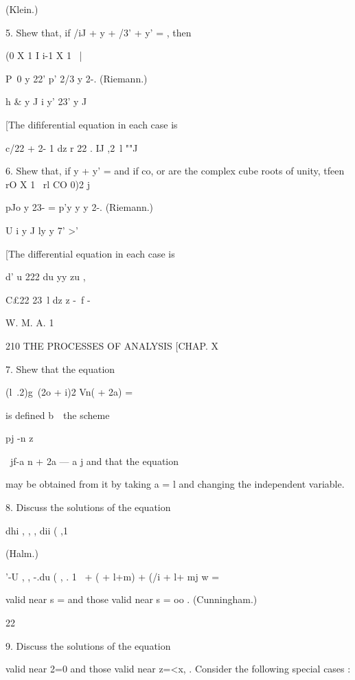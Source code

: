 (Klein.) 

5. Shew that, if /iJ + y + /3' + y' =  , then 

(0 X 1 I i-1 X 1 ~| 



P\ 0   y 22' p' 2/3 y 2-. (Riemann.) 

h \& y J i y' 23' y J 

[The dififerential equation in each case is 

c/22 +  2- 1 dz   r 22 . IJ ,2\ l ""J 

6. Shew that, if y + y' =   and if co, or are the complex cube roots of unity, tfeen 
rO X 1 \ rl CO 0)2  j 

pJo y 23- = p'y y y 2-. (Riemann.) 

U i y J ly y 7' >' 

[The differential equation in each case is 

d' u 222 du  yy zu   , 

C£22 23\ l dz   z -\ f  -  

W. M. A. 1  



210 THE PROCESSES OF ANALYSIS [CHAP. X 

7. Shew that the equation 



(l\ .2)g\ (2o + i)2 Vn(  + 2a)  = 



is defined b\ \   the scheme 

pj -n z  

\ jf-a n + 2a   — a j 
and that the equation 

may be obtained from it by taking a = l and changing the independent variable. 

8. Discuss the solutions of the equation 

dhi , , , dii ( ,1 



(Halm.) 



'-U , , -.du ( , . 1 \   
  + (  + l+m)  + (/i + l+ mj w = 

valid near s = and those valid near s = oo . (Cunningham.) 



 22 



9. Discuss the solutions of the equation 

valid near 2=0 and those valid near z=<x, . 
Consider the following special cases : 

